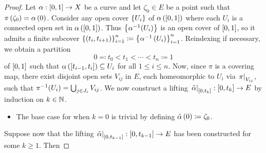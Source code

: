 \documentclass[../Moduli_Spaces_of_Riemann_Surfaces.tex]{subfiles}
\begin{document}
    \begin{proof}
        Let $\alpha:\left[0,1\right]\to X$ be a curve and let $\zeta_0\in E$ be a point such that $\pi\left(\zeta_0\right)=\alpha\left(0\right)$. Consider any open cover $\left\{U_i\right\}$ of $\alpha\left(\left[0,1\right]\right)$ where each $U_i$ is a connected open set in $\alpha\left(\left[0,1\right]\right)$. Thus $\left\{\alpha^{-1}\!\left(U_i\right)\right\}$ is an open cover of $\left[0,1\right]$, so it admits a finite subcover $\left\{\left(t_i,t_{i+1}\right)\right\}_{i=1}^n\coloneqq\left\{\alpha^{-1}\left(U_i\right)\right\}_{i=1}^n$. Reindexing if necessary, we obtain a partition
        \begin{equation*}
            0\eqqcolon t_0<t_1<\cdots<t_n\coloneqq1
        \end{equation*}
        of $\left[0,1\right]$ such that $\alpha\left(\left[t_{i-1},t_i\right]\right)\subseteq U_i$ for all $1\leq i\leq n$. Now, since $\pi$ is a covering map, there exist disjoint open sets $V_{ij}$ in $E$, each homeomorphic to $U_i$ via $\left.\pi\right|_{V_{ij}}$, such that $\pi^{-1}\!\left(U_i\right)=\bigcup_{j\in J_i}V_{ij}$. We now construct a lifting $\left.\tilde{\alpha}\right|_{\left[0,t_k\right]}:\left[0,t_k\right]\to E$ by induction on $k\in\mathbb{N}$.
        \begin{itemize}
            \item The base case for when $k=0$ is trivial by defining $\tilde{\alpha}\left(0\right)\coloneqq\zeta_0$.
        \end{itemize}
        Suppose now that the lifting $\left.\tilde{\alpha}\right|_{\left[0,t_{k-1}\right]}:\left[0,t_{k-1}\right]\to E$ has been constructed for some $k\geq1$. Then
\end{proof}
\end{document}
